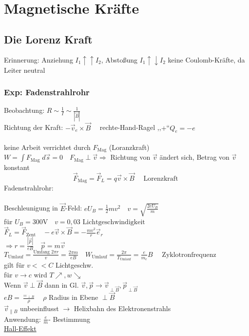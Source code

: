\documentclass[titlepage,12pt,a4paper,ngerman]{report}
\newcommand{\tx}[1]{\textrm{#1}}
\begin{document}
\section{Magnetische Kräfte}
\subsection{Die Lorenz Kraft}
Erinnerung: Anziehung $  I_1 \uparrow \uparrow I_2 $, Abstoßung $ I_1 \uparrow \downarrow I_2 $ keine Coulomb-Kräfte, da Leiter neutral
\subsubsection{Exp: Fadenstrahlrohr}
Beobachtung: $  R \sim \frac{1}{I} \sim \frac{1}{|\vec{B}|} $\\
Richtung der Kraft: $ -\vec{v}_e \times \vec{B} \quad $ rechte-Hand-Ragel ,,$ + $``$ Q_e = -e $\\\\
keine Arbeit verrichtet durch $ F_{\tx{Mag}}  $ (Loranzkraft) $ W = \int F_{\tx{Mag}} \; d\vec{s} = 0\quad F_{\tx{Mag}} \perp \vec{v} \Rightarrow $ Richtung von $ \vec{v} $ ändert sich, Betrag von $ \vec{v} $ konstant
$$\boxed{\vec{F}_{\tx{Mag}} = \vec{F}_L = q \vec{v} \times \vec{B}} \quad \tx{ Lorenzkraft }$$
Fadenstrahlrohr:\\
\\Beschleunigung in $ \vec{E} $-Feld: $ eU_B = \frac{1}{2} m v^2 \quad v = \sqrt{\frac{2 e U _B}{m}} $\\
für $ U_B = 300 \tx{V} \quad v = 0,03 \tx{ Lichtgeschwindigkeit } $\\
$ \vec{F}_L  = \vec{F} _{\tx{Zent}} \quad -e \vec{v} \times \vec{B} = - \frac{mv^2}{r} \vec{e}_r$\\
$ \Rightarrow r = \frac{|\vec{p}|}{e B } \quad \vec{p} = m \vec{v} $\\
$ T_{\tx{Umlauf}} = \frac{\tx{Umfang } 2 \pi r }{v} = \frac{ 2\pi m}{e B} \quad W _{\tx{Umlauf}} = \frac{2\pi }{T _{\tx{Umlauf}}} = \frac{e}{m_e} B \quad \tx{ Zyklotronfrequenz} $\\
gilt für $  v<<C $ Lichtgeschw.\\
für $ v \rightarrow c $ wird $ T \nearrow , w \searrow $\\
Wenn $ \vec{v} \perp \vec{B} $  dann in Gl. $ \vec{v},\vec{p} \rightarrow \vec{v}_{\perp \vec{B}}, \vec{p}_{\perp \vec{B}} $\\
$ eB = \frac{=_{\perp B}}{\rho} \quad \rho $ Radius in Ebene $ \perp \vec{B} $\\
$ \vec{v}_{\parallel B} $ unbeeinflusst $ \rightarrow $ Helixbahn des Elektronenstrahls\\
Anwendung: $ \frac{e}{m} $- Bestimmung\\
\underline{Hall-Effekt}
\end{document}
